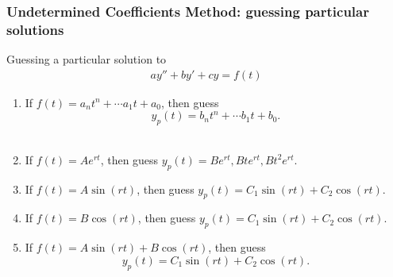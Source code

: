 \begin{frame}
  \frametitle{Undetermined Coefficients Method: guessing particular solutions}
   Guessing a particular solution to
     \begin{eqnarray*}
      a y'' + b y' + cy  = f(t)
    \end{eqnarray*}

  \begin{enumerate}
  \item If {\color{blue}$f(t) = a_nt^n+\cdots a_1t+ a_0$}, then
      guess {\color{red}$$y_p(t) = b_nt^n+\cdots b_1t+b_0.$$}\\

  \item If {\color{blue} $f(t)= A e^{rt}$}, then guess
       {\color{green} $y_p(t) = Be^{rt}, Bte^{rt}, Bt^2e^{rt}$.}\\
  \vspace{.5cm}
  \item If {\color{blue}$f(t) = A\sin(rt)$}, then guess
      {\color{red}$y_p(t) = C_1\sin(rt) +C_2\cos(rt)$.}\\
  \vspace{.5cm}

  \item If {\color{blue} $f(t) = B\cos(rt)$}, then guess
      {\color{red}$y_p(t) = C_1\sin(rt) +C_2\cos(rt)$.}\\
  \vspace{.5cm}

  \item If {\color{blue}$f(t) = A\sin(rt)+B\cos(rt)$}, then guess
     {\color{red} $$y_p(t) = C_1\sin(rt) +C_2\cos(rt).$$}
  \end{enumerate}

\end{frame}


